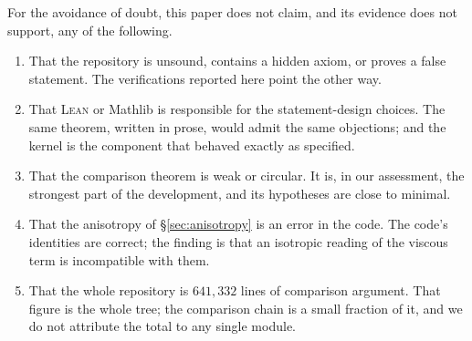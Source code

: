 \documentclass[11pt]{article}
\newcommand{\Lean}{\textsc{Lean}}
\theoremstyle{plain}
\theoremstyle{definition}
\theoremstyle{remark}
\begin{document}
For the avoidance of doubt, this paper does not claim, and its evidence does not
support, any of the following.

\begin{enumerate}
\item That the repository is unsound, contains a hidden axiom, or proves a false
statement. The verifications reported here point the other way.
\item That \Lean{} or Mathlib is responsible for the statement-design choices.
The same theorem, written in prose, would admit the same objections; and the
kernel is the component that behaved exactly as specified.
\item That the comparison theorem is weak or circular. It is, in our assessment,
the strongest part of the development, and its hypotheses are close to minimal.
\item That the anisotropy of \S\ref{sec:anisotropy} is an error in the code. The
code's identities are correct; the finding is that an isotropic reading of the
viscous term is incompatible with them.
\item That the whole repository is $641{,}332$ lines of comparison argument. That
figure is the whole tree; the comparison chain is a small fraction of it, and we
do not attribute the total to any single module.
\end{enumerate}
\end{document}

